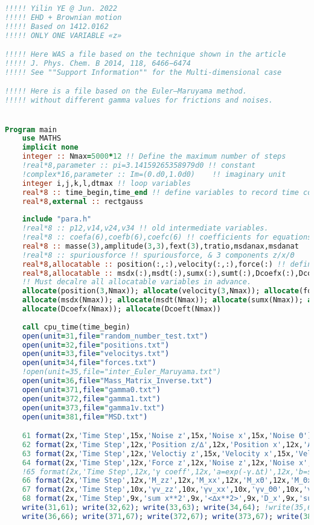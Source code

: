 \documentclass[fleqn,10pt]{InternshipReport_SI-ENS-PSL}
\begin{document}
\begin{lstlisting}[language=Fortran, caption=BEHD\_YYE.f90]
!!!!! Yilin YE @ Jun. 2022
!!!!! EHD + Brownian motion
!!!!! Based on 1412.0162
!!!!! ONLY ONE VARIABLE «z»

!!!!! Here WAS a file based on the technique shown in the article 
!!!!! J. Phys. Chem. B 2014, 118, 6466−6474
!!!!! See ""Support Information"" for the Multi-dimensional case

!!!!! Here is a file based on the Euler–Maruyama method.
!!!!! without different gamma values for frictions and noises.


Program main
    use MATHS
    implicit none    
    integer :: Nmax=5000*12 !! Define the maximum number of steps
    !real*8,parameter :: pi=3.14159265358979d0 !! constant
    !complex*16,parameter :: Im=(0.d0,1.0d0)    !! imaginary unit
    integer i,j,k,l,dtmax !! loop variables
    real*8 :: time_begin,time_end !! define variables to record time consumed
    real*8,external :: rectgauss    
    
    include "para.h"    
    !real*8 :: p12,v14,v24,v34 !! old intermediate variables.
    !real*8 :: coefa(6),coefb(6),coefc(6) !! coefficients for equations of motion
    real*8 :: masse(3),amplitude(3,3),fext(3),tratio,msdanax,msdanat
    !real*8 :: spuriousforce !! spuriousforce, & 3 components z/x/Θ
    real*8,allocatable :: position(:,:),velocity(:,:),force(:) !! define arrays for position/velocity/force
    real*8,allocatable :: msdx(:),msdt(:),sumx(:),sumt(:),Dcoefx(:),Dcoeft(:)
    !! Must decalre all allocatable variables in advance.
    allocate(position(3,Nmax)); allocate(velocity(3,Nmax)); allocate(force(Nmax))
    allocate(msdx(Nmax)); allocate(msdt(Nmax)); allocate(sumx(Nmax)); allocate(sumt(Nmax));
    allocate(Dcoefx(Nmax)); allocate(Dcoeft(Nmax))
    
    call cpu_time(time_begin)
    open(unit=31,file="random_number_test.txt")
    open(unit=32,file="positions.txt")
    open(unit=33,file="velocitys.txt")
    open(unit=34,file="forces.txt")
    !open(unit=35,file="inter_Euler_Maruyama.txt")
    open(unit=36,file="Mass_Matrix_Inverse.txt")
    open(unit=371,file="gamma0.txt")
    open(unit=372,file="gamma1.txt")
    open(unit=373,file="gamma1v.txt")
    open(unit=381,file="MSD.txt")

    61 format(2x,'Time Step',15x,'Noise z',15x,'Noise x',15x,'Noise Θ')
    62 format(2x,'Time Step',12x,'Position z/∆',12x,'Position x',12x,'Angle Θ')
    63 format(2x,'Time Step',12x,'Veloctiy z',15x,'Velocity x',15x,'Velocity Θ')
    64 format(2x,'Time Step',12x,'Force z',12x,'Noise z',12x,'Noise x',12x,'Noise Θ')
    !65 format(2x,'Time Step',12x,'γ coeff',12x,'a=exp(-γ.∆t)',12x,'b=sqrt(tanh(gt2)/gt2)',12x,'M inverse')
    66 format(2x,'Time Step',12x,'M_zz',12x,'M_xx',12x,'M_xΘ',12x,'M_Θx',12x,'M_ΘΘ')
    67 format(2x,'Time Step',10x,'γv_zz',10x,'γv_xx',10x,'γv_ΘΘ',10x,'γv_zx',10x,'γv_zΘ',10x,'γv_xΘ')
    68 format(2x,'Time Step',9x,'sum x**2',9x,'<∆x**2>',9x,'D_x',9x,'sum Θ**2',9x,'<∆Θ**2>',9x,'D_t')
    write(31,61); write(32,62); write(33,63); write(34,64); !write(35,65)
    write(36,66); write(371,67); write(372,67); write(373,67); write(381,68)
    

\end{lstlisting}
\end{document}
